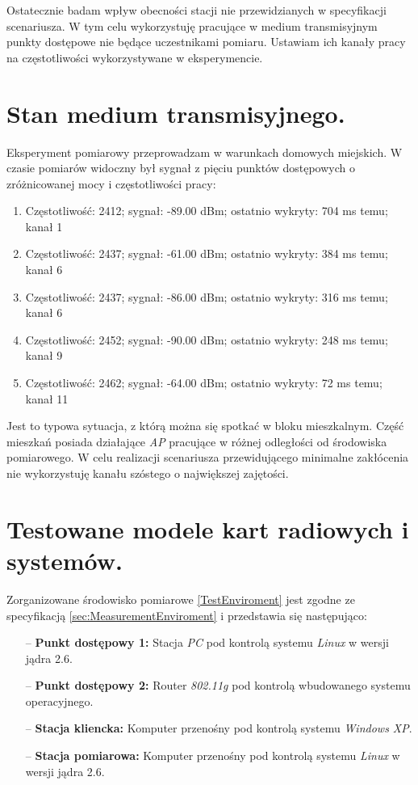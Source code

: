 Ostatecznie badam wpływ obecności stacji nie przewidzianych w specyfikacji scenariusza. W tym celu wykorzystuję pracujące w medium transmisyjnym punkty dostępowe nie będące uczestnikami pomiaru. Ustawiam ich kanały pracy na częstotliwości wykorzystywane w eksperymencie. 

\section{Stan medium transmisyjnego.}

Eksperyment pomiarowy przeprowadzam w warunkach domowych miejskich. W czasie pomiarów widoczny był sygnał z pięciu punktów dostępowych o zróżnicowanej mocy i częstotliwości pracy:

\begin{enumerate}
\item Częstotliwość: 2412; sygnał: -89.00 dBm; ostatnio wykryty: 704 ms temu; kanał 1
\item Częstotliwość: 2437; sygnał: -61.00 dBm; ostatnio wykryty: 384 ms temu; kanał 6
\item Częstotliwość: 2437; sygnał: -86.00 dBm; ostatnio wykryty: 316 ms temu; kanał 6
\item Częstotliwość: 2452; sygnał: -90.00 dBm; ostatnio wykryty: 248 ms temu; kanał 9
\item Częstotliwość: 2462; sygnał: -64.00 dBm; ostatnio wykryty: 72 ms temu; kanał 11
\end{enumerate}

Jest to typowa sytuacja, z którą można się spotkać w bloku mieszkalnym. Część mieszkań posiada działające \emph{AP} pracujące w różnej odległości od środowiska pomiarowego. W celu realizacji scenariusza przewidującego minimalne zakłócenia nie wykorzystuję kanału szóstego o największej zajętości.

\section{Testowane modele kart radiowych i systemów.}

Zorganizowane środowisko pomiarowe \ref{TestEnviroment} jest zgodne ze specyfikacją \ref{sec:MeasurementEnviroment} i przedstawia się następująco:
\begin{itemize}
\item[--] {\bf Punkt dostępowy 1:} Stacja \emph{PC} pod kontrolą systemu \emph{Linux} w wersji jądra 2.6.
\item[--] {\bf Punkt dostępowy 2:} Router \emph{802.11g} pod kontrolą wbudowanego systemu operacyjnego.
\item[--] {\bf Stacja kliencka:} Komputer przenośny pod kontrolą systemu \emph{Windows XP}.
\item[--] {\bf Stacja pomiarowa:} Komputer przenośny pod kontrolą systemu \emph{Linux} w wersji jądra 2.6.
\end{itemize}

